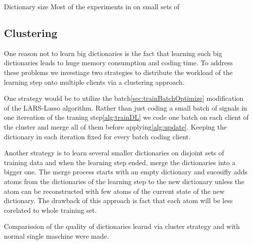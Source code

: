 

Dictionary size 
Most of the experiments in on small sets of 

\subsection{Clustering}
One reason not to learn big dictionaries is the fact that learning such big
dictionaries leads to huge memory consumption and coding time.
To address these problems we investiage two strategies to distribute the
workload of the learning step onto multiple clients via a clustering approach.

One strategy would be to utilize the batch\ref{sec:trainBatchOptimize}
modification of the LARS-Lasso algorithm. Rather than just coding a small batch
of signals in one itereation of the traning step\ref{alg:trainDL} we code one
batch on each client of the cluster and merge all of them before
applying\ref{alg:update}. Keeping the dictionary in each iteration fixed
for every batch coding client. 

Another strategy is to learn several smaller dictionaries on disjoint sets of
training data and when the learning step ended, merge the dictionaries
into a bigger one. The merge process starts with an empty dictionary and
sucesifly adds atoms from the dictionaries of the learning step to the
new dictionary unless the atom can be reconstructed with few atoms of the
current state of the new dictionary. The drawback of this approach is fact that 
each atom will be less corelated to whole training set.

Comparission of the quality of dictionaries learnd via cluster strategy and
with normal single maschine were made.






